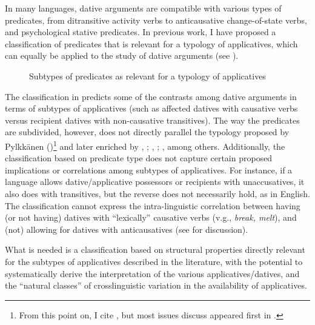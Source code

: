 \documentclass[output=paper,colorlinks,citecolor=brown,nonflat]{./langscibook}
\begin{document}
In many languages, dative arguments are compatible with various types of predicates, from ditransitive activity verbs to anticausative change-of-state verbs, and psychological stative predicates. In previous work, I have proposed a classification of predicates that is relevant for a typology of applicatives, which can equally be applied to the study of dative arguments (see ).

\begin{figure}
\caption{Subtypes of predicates as relevant for a typology of applicatives \citep[130]{Cuervo2015Chapter}}
\label{fig:cuervo:1}
\end{figure}

The classification in  predicts some of the contrasts among dative arguments in terms of subtypes of applicatives (such as affected datives with causative verbs versus recipient datives with non-causative transitives). The way the predicates are subdivided, however, does not directly parallel the typology proposed by Pylkkänen (\citeyear{Pylkkänen2002, Pylkkänen2008})\footnote{From this point on, I cite \citealt{Pylkkänen2008}, but most issues discuss appeared first in \citealt{Pylkkänen2002}.}  and later enriched by \citealt{BonehNash2011WCCFL, Cuervo2003}, \citeyear{Cuervo2010Probus}; \citealt{Kim2011high, McGinnis2001}, \citeyear{McGinnis2008}; \citealt{McGinnisGerdts2004, RobergeTroberg2009}, among others. Additionally, the classification based on predicate type does not capture certain proposed implications or correlations among subtypes of applicatives. For instance, if a language allows dative/applicative possessors or recipients with unaccusatives, it also does with transitives, but the reverse does not necessarily hold, as in English. The classification cannot express the intra-linguistic correlation between having (or not having) datives with “lexically” causative verbs (v.g., \textit{break, melt}), and (not) allowing for datives with anticausatives (see \citealt{Peterson2007, Cuervo2015Chapter} for discussion). 

What is needed is a classification based on structural properties directly relevant for the subtypes of applicatives described in the literature, with the potential to systematically derive the interpretation of the various applicatives/datives, and the “natural classes” of crosslinguistic variation in the availability of applicatives.
\end{document}
